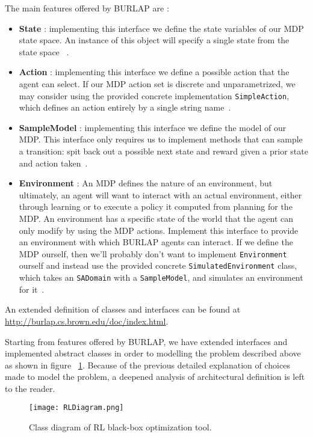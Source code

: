 The main features offered by BURLAP are :
	
\begin{itemize}
	\item \textbf{State} : implementing this interface we define the state variables of our MDP state space. An instance of this object will specify a single state from the state space~\cite{BURLAPSite} .
	\item \textbf{Action} : implementing this interface we define a possible action that the agent can select. If our MDP action set is discrete and unparametrized, we may consider using the provided concrete implementation {\tt SimpleAction}, which defines an action entirely by a single string name~\cite{BURLAPSite}.
	\item \textbf{SampleModel} : implementing this interface we define the model of our MDP. This interface only requires us to implement methods that can sample a transition: spit back out a possible next state and reward given a prior state and action taken~\cite{BURLAPSite}.
	\item  \textbf{Environment} : An MDP defines the nature of an environment, but ultimately, an agent will want to interact with an actual environment, either through learning or to execute a policy it computed from planning for the MDP. An environment has a specific state of the world that the agent can only modify by using the MDP actions. Implement this interface to provide an environment with which BURLAP agents can interact. If we define the MDP ourself, then we'll probably don't want to implement {\tt Environment} ourself and instead use the provided concrete {\tt SimulatedEnvironment} class, which takes an {\tt SADomain} with a {\tt SampleModel}, and simulates an environment for it~\cite{BURLAPSite}.
\end{itemize}

An extended definition of classes and interfaces can be found at \url{http://burlap.cs.brown.edu/doc/index.html}.

Starting from features offered by BURLAP, we have extended interfaces and implemented abstract classes in order to modelling the problem described above as shown in figure ~\ref{fig:RLUMLDiagram}. Because of the previous detailed explanation of choices made to model the problem, a deepened analysis of architectural definition is left to the reader.

\begin{figure} [h!]
	\texttt{[image: RLDiagram.png]}
	\caption{Class diagram of RL black-box optimization tool.}
	\label{fig:RLUMLDiagram}
\end{figure}